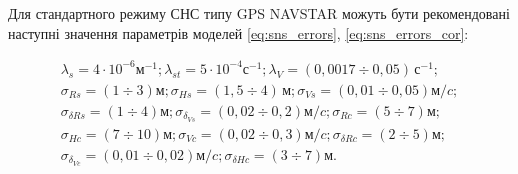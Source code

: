 Для стандартного режиму СНС типу GPS NAVSTAR можуть бути рекомендовані наступні значення 
параметрів моделей \eqref{eq:sns_errors}, \eqref{eq:sns_errors_cor}:

\[\begin{array}{l}
{\lambda_{s} =4\cdot 10^{-6} \text{м}^{-1} ;} 
{\lambda_{st} =5\cdot 10^{-4} \text{с}^{-1}; }
{\lambda_{V} =\left(0,0017\div 0,05\right)\, \text{с}^{-1};}\\
{\sigma_{Rs} =\left(1\div 3\right) \text{м};}
{\sigma_{Hs} =\left(1,5\div 4\right)\, \text{м};}
{\sigma_{Vs} =\left(0,01\div 0,05\right) \text{м}/c;}\\
{\sigma_{\delta Rs} =\left(1\div 4\right) \text{м}; }
{\sigma_{\delta_{Vs} } =\left(0,02\div 0,2\right) \text{м}/c;} 
{\sigma_{Rc} =\left(5\div 7\right) \text{м};}\\
{\sigma_{Hc} =\left(7\div 10\right) \text{м};  }
{\sigma_{Vc} =\left(0,02\div 0,3\right) \text{м}/c;}
{\sigma_{\delta Rc} =\left(2\div 5\right) \text{м};}\\
{\sigma_{\delta_{Vc} } =\left(0,01\div 0,02\right) \text{м}/c;}
{\sigma_{\delta Hc} =\left(3\div 7\right) \text{м}.}
\end{array}\] 

